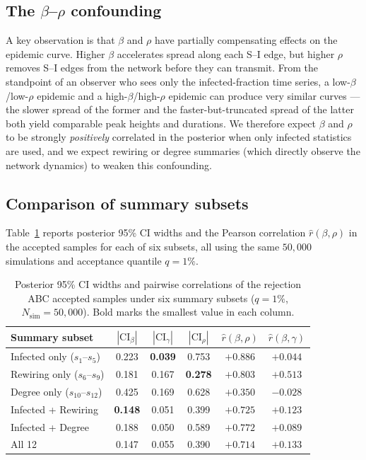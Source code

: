 \documentclass[11pt]{article}
\begin{document}
\subsection{The $\beta$--$\rho$ confounding}

A key observation is that $\beta$ and $\rho$ have partially compensating effects on the epidemic curve. Higher $\beta$ accelerates spread along each S--I edge, but higher $\rho$ removes S--I edges from the network before they can transmit. From the standpoint of an observer who sees only the infected-fraction time series, a low-$\beta$/low-$\rho$ epidemic and a high-$\beta$/high-$\rho$ epidemic can produce very similar curves --- the slower spread of the former and the faster-but-truncated spread of the latter both yield comparable peak heights and durations. We therefore expect $\beta$ and $\rho$ to be strongly \emph{positively} correlated in the posterior when only infected statistics are used, and we expect rewiring or degree summaries (which directly observe the network dynamics) to weaken this confounding.

\subsection{Comparison of summary subsets}

Table~\ref{tab:summary_subsets} reports posterior 95\% CI widths and the Pearson correlation $\hat r(\beta,\rho)$ in the accepted samples for each of six subsets, all using the same $50{,}000$ simulations and acceptance quantile $q=1\%$.

\begin{table}[htb]
\centering
\small
\begin{tabular}{lccccc}
\toprule
Summary subset & $|\text{CI}_\beta|$ & $|\text{CI}_\gamma|$ & $|\text{CI}_\rho|$ & $\hat r(\beta,\rho)$ & $\hat r(\beta,\gamma)$ \\
\midrule
Infected only ($s_1$--$s_5$)        & 0.223 & \textbf{0.039} & 0.753 & $+0.886$ & $+0.044$ \\
Rewiring only ($s_6$--$s_9$)        & 0.181 & 0.167 & \textbf{0.278} & $+0.803$ & $+0.513$ \\
Degree only ($s_{10}$--$s_{12}$)    & 0.425 & 0.169 & 0.628 & $+0.350$ & $-0.028$ \\
Infected + Rewiring                 & \textbf{0.148} & 0.051 & 0.399 & $+0.725$ & $+0.123$ \\
Infected + Degree                   & 0.188 & 0.050 & 0.589 & $+0.772$ & $+0.089$ \\
All 12                              & 0.147 & 0.055 & 0.390 & $+0.714$ & $+0.133$ \\
\bottomrule
\end{tabular}
\caption{Posterior 95\% CI widths and pairwise correlations of the rejection ABC accepted samples under six summary subsets ($q=1\%$, $N_{\text{sim}}=50{,}000$). Bold marks the smallest value in each column.}
\label{tab:summary_subsets}
\end{table}
\end{document}
